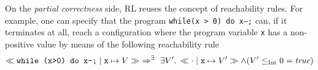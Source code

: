 

On the \emph{partial correctness} side, RL reuses the concept of reachability rules.
For example, one can specify that the program \texttt{while(x > 0) do x--;}
can, if it terminates at all, reach a configuration
where the program variable \texttt{x} has a non-positive value
by means of the following reachability rule
\begin{equation*}
  \ll\texttt{while (x>0) do x--;}\mid \mathtt{x}\mapsto V\gg
  \ \Rightarrow^\exists\  \exists V^\prime.\, \ll\texttt{$\cdot$}\mid \mathtt{x}\mapsto V'\gg \land (V^\prime \leq_\text{Int} 0 = \mathit{true})
  \end{equation*}
  
